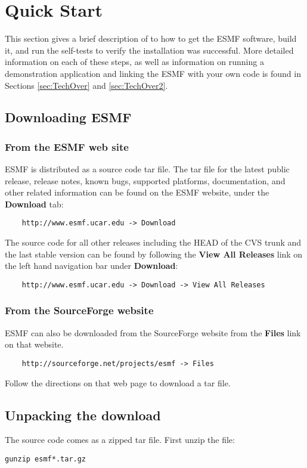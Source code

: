 \section{Quick Start}
\label{sec:QuickStart}

This section gives a brief
description of to how to get the ESMF software, build it, 
and run the self-tests to verify the installation was successful.
More detailed information on each of these steps, as well as
information on running a demonstration application and linking
the ESMF with your own code is found in Sections \ref{sec:TechOver} 
and \ref{sec:TechOver2}.  

\subsection{Downloading ESMF}
\subsubsection{From the ESMF web site}
\label{sec:download}
ESMF is distributed as a source code tar file.  The tar file for the latest
public release, release notes, 
known bugs, supported platforms, documentation, and other related information 
can be found on the ESMF website, under the {\bf Download} tab:
\begin{verbatim}
    http://www.esmf.ucar.edu -> Download
\end{verbatim}
The source code for all other releases including the HEAD of the CVS trunk and the
last stable version can be found by following the {\bf View All Releases} link on the left hand navigation bar under {\bf Download}:
\begin{verbatim}
    http://www.esmf.ucar.edu -> Download -> View All Releases
\end{verbatim}

\subsubsection{From the SourceForge website}
ESMF can also be downloaded from the SourceForge website
from the {\bf Files} link on that website.
\begin{verbatim}
    http://sourceforge.net/projects/esmf -> Files
\end{verbatim}
Follow the directions on that web page to download a tar file.  

\subsection{Unpacking the download}
The source code comes as a zipped tar file. First unzip the file:
\begin{verbatim}
gunzip esmf*.tar.gz
\end{verbatim}

